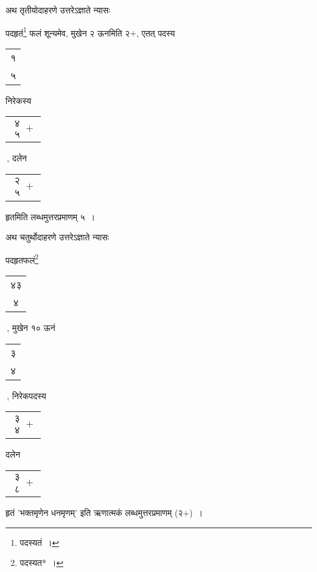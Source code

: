 \documentclass[10pt, openany]{book}
\begin{document}
{{{{{{{अथ तृतीयोदाहरणे उत्तरेऽज्ञाते न्यासः\textemdash}
\vspace{1mm}

\vspace{2mm}

{पदहृतं\renewcommand{\thefootnote}{९}\footnote{पदस्यतं~।}  फलं शून्यमेव, मुखेन २ ऊनमिति २$+$, एतत् पदस्य \begin{tabular}{|c|} १\\ ५\end{tabular}
 निरेकस्य \begin{tabular}{|c|}$\begin{matrix}
\mbox{{४}}\\
\mbox{{५}}
\end{matrix}+$\end{tabular}\,, दलेन \begin{tabular}{|c|} $\begin{matrix}
\mbox{{२}}\\
\mbox{{५}}
\end{matrix}+$\end{tabular}  हृतमिति लब्धमुत्तरप्रमाणम् ५~।}
\vspace{2mm}

{अथ चतुर्थोदाहरणे उत्तरेऽज्ञाते न्यासः\textendash}
\vspace{1mm}

\vspace{2mm}

{पदहृतफलं\renewcommand{\thefootnote}{१०}\footnote{पदस्यत*~।}  \begin{tabular}{|c|}४३\\ ४\end{tabular}\,, मुखेन १० ऊनं \begin{tabular}{|c|} ३\\ ४ \end{tabular}\,,
निरेकपदस्य \begin{tabular}{|c|}$\begin{matrix}
\mbox{{३}}\\
\mbox{{४}}
\end{matrix}+$\end{tabular} दलेन \begin{tabular}{|c|}$\begin{matrix}
\mbox{{३}}\\
\mbox{{८}}
\end{matrix}+$\end{tabular} हृतं {\qt 'भक्तमृणेन धनमृणम्'} इति ऋणात्मकं लब्धमुत्तरप्रमाणम् (२$+$)~।}
\vspace{2mm}

}}}}}}
\end{document}

